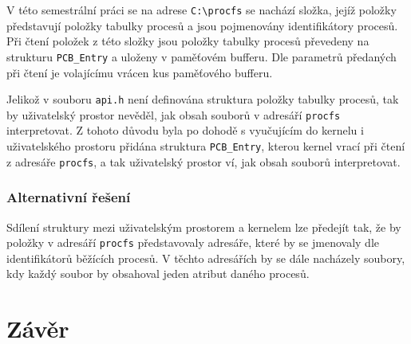 \documentclass[12pt, a4paper]{article}
\let\oldsection\section
\renewcommand\section{\clearpage\oldsection}
\begin{document}
V této semestrální práci se na adrese \texttt{C:\textbackslash procfs} se nachází složka, jejíž položky představují položky tabulky procesů a jsou pojmenovány identifikátory procesů. Při čtení položek z této složky jsou položky tabulky procesů převedeny na strukturu \texttt{PCB\_Entry} a uloženy v paměťovém bufferu. Dle parametrů předaných při čtení je volajícímu vrácen kus paměťového bufferu.

Jelikož v souboru \texttt{api.h} není definována struktura položky tabulky procesů, tak by uživatelský prostor nevěděl, jak obsah souborů v adresáří \texttt{procfs} interpretovat. Z tohoto důvodu byla po dohodě s vyučujícím do kernelu i uživatelského prostoru přidána struktura \texttt{PCB\_Entry}, kterou kernel vrací při čtení z adresáře \texttt{procfs}, a tak uživatelský prostor ví, jak obsah souborů interpretovat.

\subsubsection{Alternativní řešení}
Sdílení struktury mezi uživatelským prostorem a kernelem lze předejít tak, že by položky v adresáří \texttt{procfs} představovaly adresáře, které by se jmenovaly dle identifikátorů běžících procesů. V těchto adresářích by se dále nacházely soubory, kdy každý soubor by obsahoval jeden atribut daného procesů.


\section{Závěr}	
\end{document}
